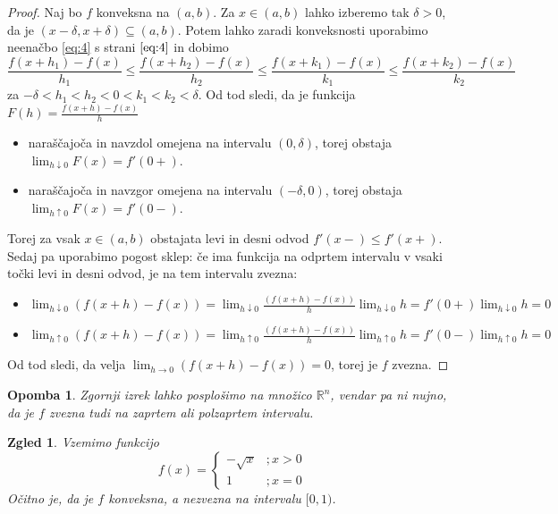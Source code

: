 \documentclass[10pt, a4paper]{article}
\newtheorem*{opomba}{Opomba}
\newtheorem{zgled}{Zgled}[section]
\newenvironment{noticeC}{%
  \tcolorbox[%
  notitle,
  empty,
  enhanced,  %
  breakable,
  coltext=black, 
  fontupper=\rmfamily,
  parbox=false,
  noparskip,
  sharp corners,
  boxrule=-1pt,  %
  frame hidden,
  left=7pt,  %
  right=7pt,
  top=5pt,
  bottom=5pt,
  before skip=2.5ex plus 2pt,
  after skip=2.5ex plus 2pt,
  overlay unbroken and last={%
  },
  ]}
{\endtcolorbox}
\newenvironment{dokaz}%
  {\begin{noticeC}\begin{proof}}%
  {\end{proof}\end{noticeC}}
\newcommand{\R}{\mathbb {R}}
\newcommand{\limf}[3]{\lim_{#1 \to #2} {#3}}
\newcommand{\rlimf}[3]{\lim_{#1 \downarrow #2} {#3}}
\newcommand{\llimf}[3]{\lim_{#1 \uparrow #2} {#3}}
\begin{document}
\begin{dokaz}
    Naj bo $f$ konveksna na $(a, b)$.
    Za $x \in (a, b)$ lahko izberemo tak $\delta > 0$, da je $(x - \delta, x + \delta) \subseteq (a, b)$.
    Potem lahko zaradi konveksnosti uporabimo neenačbo \eqref{eq:4} s strani $\pageref{eq:4}$ in dobimo
    $$\frac{f(x+h_1) - f(x)}{h_1} \le\frac{f(x+h_2) - f(x)}{h_2} \le \frac{f(x+k_1) - f(x)}{k_1} \le \frac{f(x+k_2) - f(x)}{k_2}$$
    za $- \delta < h_1 < h_2 < 0 < k_1 < k_2 < \delta.$
    Od tod sledi, da je funkcija $F(h) = \frac{f(x+h) - f(x)}{h}$
    \begin{itemize}
        \item naraščajoča in navzdol omejena na intervalu $(0, \delta)$, torej obstaja $\rlimf{h}{0}{F(x)} = f'(0+)$.
        \item naraščajoča in navzgor omejena na intervalu $(-\delta, 0)$, torej obstaja $\llimf{h}{0}{F(x)} = f'(0-)$.
    \end{itemize}
    Torej za vsak $x \in (a,b)$ obstajata levi in desni odvod $f'(x-) \leq f'(x+)$.
    Sedaj pa uporabimo pogost sklep: če ima funkcija na odprtem intervalu v vsaki točki levi in desni odvod, je na tem intervalu zvezna:
    \begin{itemize}
        \item $\displaystyle \rlimf{h}{0}{(f(x+h) - f(x))} = \rlimf{h}{0}{\frac{(f(x+h) - f(x))}{h} \rlimf{h}{0}{h}} = f'(0+) \rlimf{h}{0}{h} = 0$
        \item $\displaystyle \llimf{h}{0}{(f(x+h) - f(x))} = \llimf{h}{0}{\frac{(f(x+h) - f(x))}{h} \llimf{h}{0}{h}} = f'(0-) \llimf{h}{0}{h} = 0$
    \end{itemize}
    Od tod sledi, da velja $\limf{h}{0}{(f(x+h) - f(x))} = 0$, torej je $f$ zvezna.
\end{dokaz}

\begin{opomba}
    Zgornji izrek lahko posplošimo na množico $\R^n$, vendar pa ni nujno, da je $f$ zvezna tudi na zaprtem ali polzaprtem intervalu.
\end{opomba}

\begin{zgled}
    Vzemimo funkcijo 
    $$f(x) = \begin{cases}
        -\sqrt{x} &; x > 0\\
        1 &; x = 0
    \end{cases}$$
    Očitno je, da je $f$ konveksna, a nezvezna na intervalu $[0,1)$.
\end{zgled}
\end{document}
